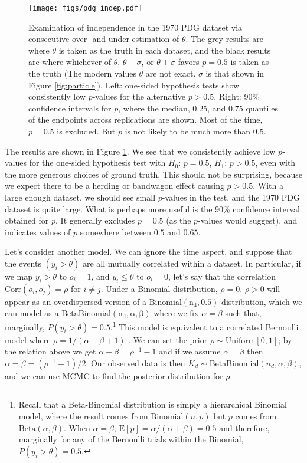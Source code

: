 \documentclass[letterpaper,12pt]{article}
\begin{document}
\begin{figure}[htbp]
  \texttt{[image: figs/pdg\_indep.pdf]}
  \caption{Examination of independence in the 1970 PDG dataset via consecutive over- and under-estimation of $\theta$. The grey results are where $\theta$ is taken as the truth in each dataset, and the black results are where whichever of $\theta$, $\theta-\sigma$, or $\theta+\sigma$ favors $p=0.5$ is taken as the truth (The modern values $\theta$ are not exact. $\sigma$ is that shown in Figure \ref{fig:particle}). Left: one-sided hypothesis tests show consistently low $p$-values for the alternative $p>0.5$. Right: 90\% confidence intervals for $p$, where the median, 0.25, and 0.75 quantiles of the endpoints across replications are shown. Most of the time, $p=0.5$ is excluded. But $p$ is not likely to be much more than $0.5$.}
  \label{fig:pdg-indep}
\end{figure}

The results are shown in Figure \ref{fig:pdg-indep}. We see that we consistently achieve low $p$-values for the one-sided hypothesis test with $H_0$: $p=0.5$, $H_1$: $p>0.5$, even with the more generous choices of ground truth. This should not be surprising, because we expect there to be a herding or bandwagon effect causing $p>0.5$. With a large enough dataset, we should see small $p$-values in the test, and the 1970 PDG dataset is quite large. What is perhaps more useful is the 90\% confidence interval obtained for $p$. It generally excludes $p=0.5$ (as the $p$-values would suggest), and indicates values of $p$ somewhere between $0.5$ and $0.65$.

Let's consider another model. We can ignore the time aspect, and suppose that the events $(y_i>\theta)$ are all mutually correlated within a dataset. In particular, if we map $y_i>\theta$ to $o_i=1$, and $y_i\leq \theta$ to $o_i=0$, let's say that the correlation $\mathrm{Corr}(o_i,o_j)=\rho$ for $i\neq j$. Under a Binomial distribution, $\rho=0$. $\rho>0$ will appear as an overdispersed version of a $\mathrm{Binomial(n_d,0.5)}$ distribution, which we can model as a $\mathrm{BetaBinomial(n_d,\alpha,\beta)}$ where we fix $\alpha=\beta$ such that, marginally, $P(y_i>\theta)=0.5$.\footnote{Recall that a Beta-Binomial distribution is simply a hierarchical Binomial model, where the result comes from $\mathrm{Binomial}(n,p)$ but $p$ comes from $\mathrm{Beta}(\alpha,\beta)$. When $\alpha=\beta$, $\mathrm{E}[p]=\alpha/(\alpha+\beta)=0.5$ and therefore, marginally for any of the Bernoulli trials within the Binomial, $P(y_i>\theta)=0.5$.} This model is equivalent to a correlated Bernoulli model where $\rho=1/(\alpha+\beta+1)$ \cite[eq.~6]{hisakado2006correlated}. We can set the prior $\rho\sim\mathrm{Uniform}[0,1]$; by the relation above we get $\alpha+\beta=\rho^{-1}-1$ and if we assume $\alpha=\beta$ then $\alpha=\beta=(\rho^{-1}-1)/2$. Our observed data is then $K_d\sim\mathrm{BetaBinomial}(n_d,\alpha,\beta)$, and we can use MCMC to find the posterior distribution for $\rho$.
\end{document}
